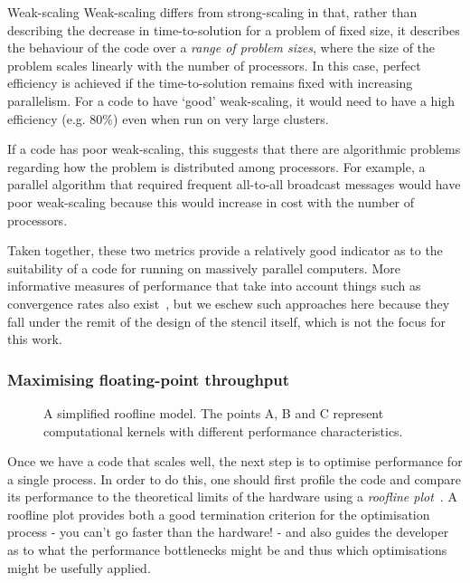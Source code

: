 \begin{paragraph}{Weak-scaling}
  Weak-scaling differs from strong-scaling in that, rather than describing the decrease in time-to-solution for a problem of fixed size, it describes the behaviour of the code over a \textit{range of problem sizes}, where the size of the problem scales linearly with the number of processors.
  In this case, perfect efficiency is achieved if the time-to-solution remains fixed with increasing parallelism.
  For a code to have `good' weak-scaling, it would need to have a high efficiency (e.g. 80\%) even when run on very large clusters.

  If a code has poor weak-scaling, this suggests that there are algorithmic problems regarding how the problem is distributed among processors.
  For example, a parallel algorithm that required frequent all-to-all broadcast messages would have poor weak-scaling because this would increase in cost with the number of processors.
\end{paragraph}

\vspace{1em}

Taken together, these two metrics provide a relatively good indicator as to the suitability of a code for running on massively parallel computers.
More informative measures of performance that take into account things such as convergence rates also exist~\cite{changComparativeStudyFinite2018}, but we eschew such approaches here because they fall under the remit of the design of the stencil itself, which is not the focus for this work.

\subsubsection{Maximising floating-point throughput}
\label{sec:background_perf_flops}

\begin{figure}
  
  \caption{
    A simplified roofline model.
    The points A, B and C represent computational kernels with different performance characteristics.
  }
  \label{fig:roofline}
\end{figure}


Once we have a code that scales well, the next step is to optimise performance for a single process.
In order to do this, one should first profile the code and compare its performance to the theoretical limits of the hardware using a \textit{roofline plot}~\cite{williamsRooflineInsightfulVisual2009}.
A roofline plot provides both a good termination criterion for the optimisation process - you can't go faster than the hardware! - and also guides the developer as to what the performance bottlenecks might be and thus which optimisations might be usefully applied.

